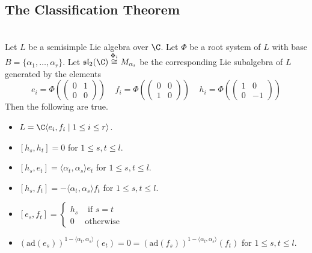 \documentclass[a4paper]{article}
\begin{document}
\subsection{The Classification Theorem}
\begin{prp}{}{} \\Let $L$ be a semisimple Lie algebra over $\C$. Let $\Phi$ be a root system of $L$ with base $B=\{\alpha_1,\dots,\alpha_r\}$. Let $\mathfrak{sl}_2(\C)\overset{\Phi_i}{\cong}M_{\alpha_i}$ be the corresponding Lie subalgebra of $L$ generated by the elements $$e_i=\Phi\left(\begin{pmatrix}
0 & 1\\
0 & 0
\end{pmatrix}\right)\;\;\;\;f_i=\Phi\left(\begin{pmatrix}
0 & 0\\
1 & 0
\end{pmatrix}\right)\;\;\;\;h_i=\Phi\left(\begin{pmatrix}
1 & 0\\
0 & -1
\end{pmatrix}\right)$$ Then the following are true. 
\begin{itemize}
\item $L=\C\langle e_i,f_i\;|\;1\leq i\leq r\rangle$. 
\item $[h_s,h_t]=0$ for $1\leq s,t\leq l$. 
\item $[h_s,e_t]=\langle\alpha_t,\alpha_s\rangle e_t$ for $1\leq s,t\leq l$. 
\item $[h_s,f_t]=-\langle\alpha_t,\alpha_s\rangle f_t$ for $1\leq s,t\leq l$. 
\item $[e_s,f_t]=\begin{cases}
h_s & \text{ if } s=t\\
0 & \text{otherwise}
\end{cases}$
\item $\left(\text{ad}(e_s)\right)^{1-\langle\alpha_t,\alpha_s\rangle}(e_t)=0=\left(\text{ad}(f_s)\right)^{1-\langle\alpha_t,\alpha_s\rangle}(f_t)$ for $1\leq s,t\leq l$. 
\end{itemize}
\end{prp}
\end{document}
